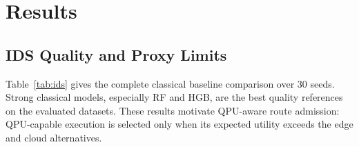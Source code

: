 \documentclass[conference]{IEEEtran}
\begin{document}
\begin{table}[t]
\caption{Route-cost and telemetry assumptions.}
\label{tab:energy_source}
\centering
\scriptsize
{}
\end{table}

\section{Results}
\subsection{IDS Quality and Proxy Limits}
Table~\ref{tab:ids} gives the complete classical baseline comparison over 30 seeds. Strong classical models, especially RF and HGB, are the best quality references on the evaluated datasets. These results motivate QPU-aware route admission: QPU-capable execution is selected only when its expected utility exceeds the edge and cloud alternatives.
\end{document}
